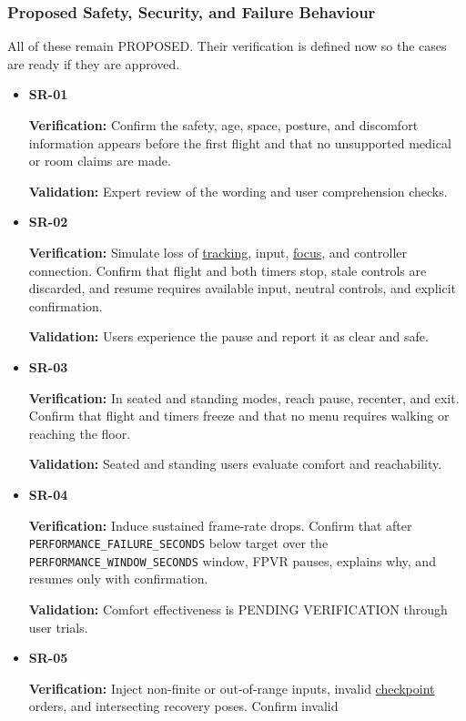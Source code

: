 \documentclass[12pt]{article}
\begin{document}
\subsubsection{Proposed Safety, Security, and Failure Behaviour}
\label{sec:safety-proposals}
All of these remain PROPOSED. Their verification is defined now so the cases
are ready if they are approved.
\begin{itemize}
\item \hypertarget{req:SR-01}{}\textbf{SR-01}\par
 \textbf{Verification:} Confirm the safety, age, space, posture, and
 discomfort information appears before the first flight and that no unsupported
 medical or room claims are made.\par
 \textbf{Validation:} Expert review of the wording and user comprehension checks.
\item \hypertarget{req:SR-02}{}\textbf{SR-02}\par
 \textbf{Verification:} Simulate loss of \hyperlink{glos:Tracking}{tracking}, input, \hyperlink{glos:Focus}{focus}, and
 controller connection. Confirm that flight and both timers stop, stale
 controls are discarded, and resume requires available input, neutral controls,
 and explicit confirmation.\par
 \textbf{Validation:} Users experience the pause and report it as clear and safe.
\item \hypertarget{req:SR-03}{}\textbf{SR-03}\par
 \textbf{Verification:} In seated and standing modes, reach pause,
 recenter, and exit. Confirm that flight and timers freeze and that no menu
 requires walking or reaching the floor.\par
 \textbf{Validation:} Seated and standing users evaluate comfort and reachability.
\item \hypertarget{req:SR-04}{}\textbf{SR-04}\par
 \textbf{Verification:} Induce sustained frame-rate drops. Confirm that after
 \texttt{PERFORMANCE\_FAILURE\_SECONDS} below target over the
 \texttt{PERFORMANCE\_WINDOW\_SECONDS} window, FPVR pauses, explains why, and
 resumes only with confirmation.\par
 \textbf{Validation:} Comfort effectiveness is PENDING VERIFICATION through user trials.
\item \hypertarget{req:SR-05}{}\textbf{SR-05}\par
 \textbf{Verification:} Inject non-finite or out-of-range inputs, invalid
 \hyperlink{glos:Checkpoint}{checkpoint} orders, and intersecting recovery poses. Confirm invalid

\end{itemize}
\end{document}
